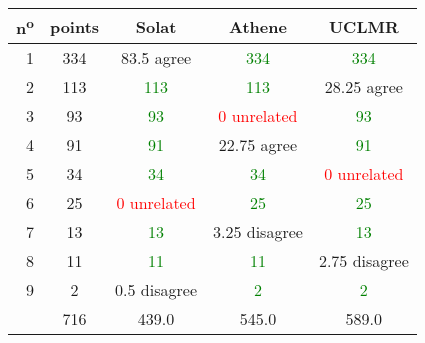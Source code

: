 \begin{center}
 \begin{tabular}{ r | c || c c c }
  n\textsuperscript{o} & points & Solat                        & Athene                       & UCLMR                        \\ \hline
  1                    & 334    & 83.5 agree                   & \textcolor{green}{334}       & \textcolor{green}{334}       \\
  2                    & 113    & \textcolor{green}{113}       & \textcolor{green}{113}       & 28.25 agree                  \\
  3                    & 93     & \textcolor{green}{93}        & \textcolor{red}{0 unrelated} & \textcolor{green}{93}        \\
  4                    & 91     & \textcolor{green}{91}        & 22.75 agree                  & \textcolor{green}{91}        \\
  5                    & 34     & \textcolor{green}{34}        & \textcolor{green}{34}        & \textcolor{red}{0 unrelated} \\
  6                    & 25     & \textcolor{red}{0 unrelated} & \textcolor{green}{25}        & \textcolor{green}{25}        \\
  7                    & 13     & \textcolor{green}{13}        & 3.25 disagree                & \textcolor{green}{13}        \\
  8                    & 11     & \textcolor{green}{11}        & \textcolor{green}{11}        & 2.75 disagree                \\
  9                    & 2      & 0.5 disagree                 & \textcolor{green}{2}         & \textcolor{green}{2}         \\ \hline
                       & 716    & 439.0                        & 545.0                        & 589.0                        \\
 \end{tabular}
\end{center}

